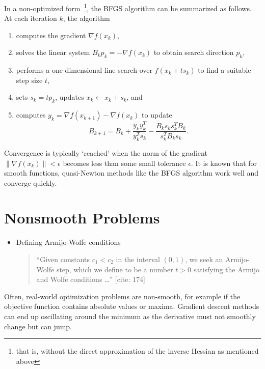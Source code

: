 \documentclass{article}
\begin{document}
In a non-optimized form~\footnote{
    that is, without the direct approximation of the
    inverse Hessian as mentioned above
}, the BFGS algorithm can be
summarized as follows. At each iteration $k$, the algorithm
\begin{enumerate}
    \item computes the gradient $\nabla f(x_k)$,
    \item solves the linear system $B_k p_k = -\nabla f(x_k)$
          to obtain search direction $p_k$,
    \item performs a one-dimensional line search over
          $f(x_k + t s_k)$ to find a suitable step size $t$,
    \item sets $s_k = t p_k$, updates $x_k \leftarrow x_k + s_k$, and
    \item computes $y_k = \nabla f(x_{k+1}) - \nabla f(x_k)$ to update
          \[
              B_{k+1} = B_k + \frac{y_k y_k^T}{y_k^T s_k}
              - \frac{B_k s_k s_k^T B_k}{s_k^T B_k s_k}.
          \]
\end{enumerate}
Convergence is typically `reached' when the norm of the gradient
$\| \nabla f(x_k) \| < \epsilon$ becomes less than some
small tolerance $\epsilon$.
It is known that for smooth functions, quasi-Newton methods
like the BFGS algorithm work well and converge quickly.

\section{Nonsmooth Problems}

\begin{itemize}
    \item Defining Armijo-Wolfe conditions
          \begin{quote}
              ``Given constants $c_1 < c_2$ in the interval $(0, 1)$, we
              seek an Armijo-Wolfe step, which we define to be a number
              $t > 0$ satisfying the Armijo and Wolfe conditions \dots'' [cite: 174]
          \end{quote}

\end{itemize}

Often, real-world optimization problems are non-smooth, for example
if the objective function contains absolute values or maxima.
Gradient descent methods can end up oscillating around the minimum
as the derivative must not smoothly change but can jump.
\end{document}
